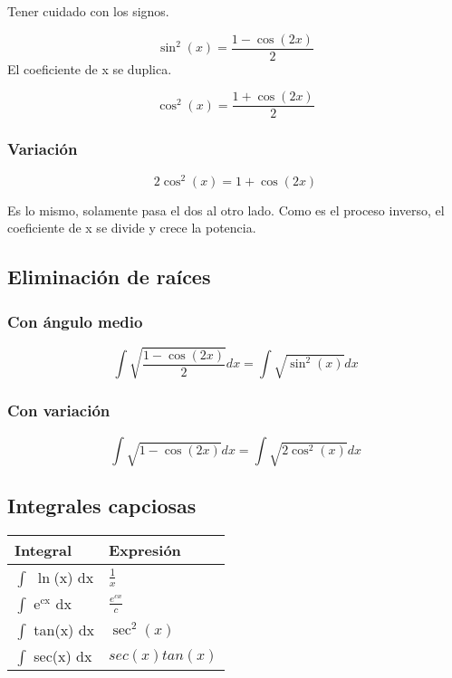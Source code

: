 \documentclass[11pt]{article}
\begin{document}
Tener cuidado con los signos.

\[\sin^2(x) = \frac{1 - \cos(2x)}{2}  \]
El coeficiente de x se duplica.

\[\cos^2(x) = \frac{1 + \cos(2x)}{2}  \]

\subsubsection{Variación}
\label{sec-3-3-1}

\[2\cos^2(x) = 1 + \cos(2x) \]

Es lo mismo, solamente pasa el dos al otro lado.
Como es el proceso inverso, el coeficiente de x se divide 
y crece la potencia. 

\subsection{Eliminación de raíces}
\label{sec-3-4}
\subsubsection{Con ángulo medio}
\label{sec-3-4-1}

\[\int \sqrt{\frac{1 - \cos(2x)}{2}} dx = \int \sqrt{\sin^2(x)}dx \]

\subsubsection{Con variación}
\label{sec-3-4-2}
\[\int \sqrt{1 - \cos(2x)} dx = \int \sqrt{2\cos^2(x)}dx \]
\subsection{Integrales capciosas}
\label{sec-3-5}


\begin{center}
\begin{tabular}{ll}
Integral & Expresión\\
\hline
$\int$ $\ln$(x) dx & $\frac{1}{x}$\\
$\int$ e$^{\text{cx}}$ dx & $\frac{e^{cx}}{c}$\\
$\int$ tan(x) dx & $\sec^2(x)$\\
$\int$ sec(x) dx & $sec(x)tan(x)$\\
\end{tabular}
\end{center}
\end{document}
